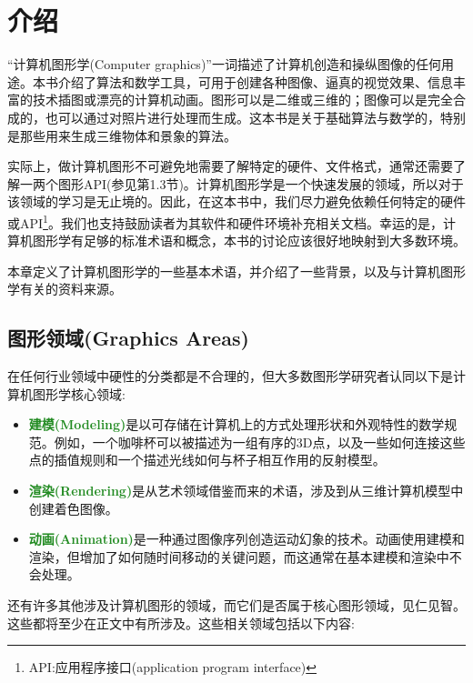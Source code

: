 

\chapter{介绍}
\label{chap01}

“计算机图形学(Computer graphics)”一词描述了计算机创造和操纵图像的任何用途。本书介绍了算法和数学工具，可用于创建各种图像、逼真的视觉效果、信息丰富的技术插图或漂亮的计算机动画。图形可以是二维或三维的；图像可以是完全合成的，也可以通过对照片进行处理而生成。这本书是关于基础算法与数学的，特别是那些用来生成三维物体和景象的算法。

实际上，做计算机图形不可避免地需要了解特定的硬件、文件格式，通常还需要了解一两个图形API(参见第1.3节)。计算机图形学是一个快速发展的领域，所以对于该领域的学习是无止境的。因此，在这本书中，我们尽力避免依赖任何特定的硬件或API\footnote{API:应用程序接口(application program interface)}。我们也支持鼓励读者为其软件和硬件环境补充相关文档。幸运的是，计算机图形学有足够的标准术语和概念，本书的讨论应该很好地映射到大多数环境。

本章定义了计算机图形学的一些基本术语，并介绍了一些背景，以及与计算机图形学有关的资料来源。

\section{图形领域(Graphics Areas)}

在任何行业领域中硬性的分类都是不合理的，但大多数图形学研究者认同以下是计算机图形学核心领域:

\begin{itemize}
	\item \textbf{\textcolor{ForestGreen}{建模(Modeling)}}是以可存储在计算机上的方式处理形状和外观特性的数学规范。例如，一个咖啡杯可以被描述为一组有序的3D点，以及一些如何连接这些点的插值规则和一个描述光线如何与杯子相互作用的反射模型。
	
	\item \textbf{\textcolor{ForestGreen}{渲染(Rendering)}}是从艺术领域借鉴而来的术语，涉及到从三维计算机模型中创建着色图像。
	
	\item \textbf{\textcolor{ForestGreen}{动画(Animation)}}是一种通过图像序列创造运动幻象的技术。动画使用建模和渲染，但增加了如何随时间移动的关键问题，而这通常在基本建模和渲染中不会处理。
\end{itemize}

还有许多其他涉及计算机图形的领域，而它们是否属于核心图形领域，见仁见智。这些都将至少在正文中有所涉及。这些相关领域包括以下内容:

